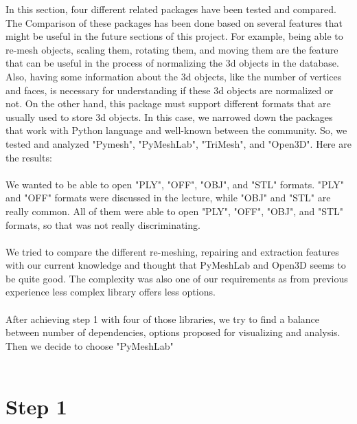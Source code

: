 \documentclass[10pt,twocolumn,letterpaper]{article}
\begin{document}
In this section, four different related packages have been tested and compared. The Comparison of these packages has been done based on several features that might be useful in the future sections of this project. For example, being able to re-mesh objects, scaling them, rotating them, and moving them are the feature that can be useful in the process of normalizing the 3d objects in the database. Also, having some information about the 3d objects, like the number of vertices and faces, is necessary for understanding if these 3d objects are normalized or not. On the other hand, this package must support different formats that are usually used to store 3d objects.
In this case, we narrowed down the packages that work with Python language and well-known between the community. So, we tested and analyzed "Pymesh", "PyMeshLab", "TriMesh", and "Open3D". Here are the results:\\ \\
	We wanted to be able to open "PLY", "OFF", "OBJ", and "STL" formats. "PLY" and "OFF" formats were discussed in the lecture, while "OBJ" and "STL" are really common. All of them were able to open "PLY", "OFF", "OBJ", and "STL" formats, so that was not really discriminating. \\ \\
	We tried to compare the different re-meshing, repairing and extraction features with our current knowledge and thought that PyMeshLab and Open3D seems to be quite good. The complexity was also one of our requirements as from previous experience less complex library offers less options. \\ \\
	After achieving step 1 with four of those libraries, we try to find a balance between number of dependencies, options proposed for visualizing and analysis. Then we decide to choose "PyMeshLab"\cite{pymeshlab} \\ \\
	
\section{Step 1}
\end{document}
